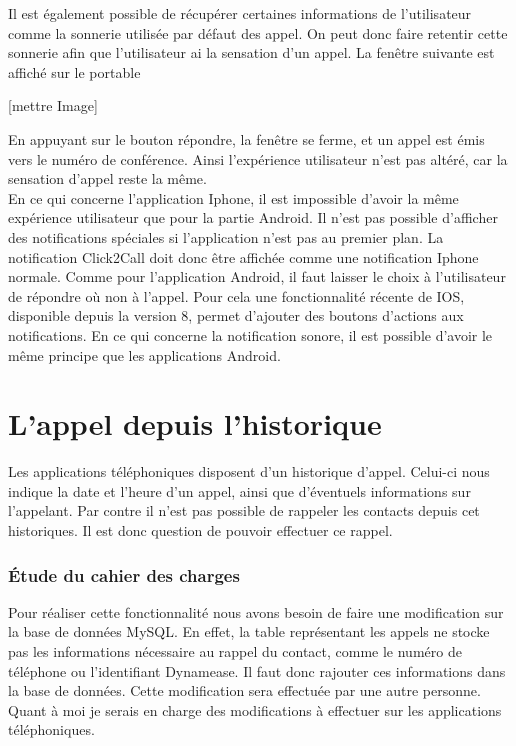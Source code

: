 Il est également possible de récupérer certaines informations de l'utilisateur comme la sonnerie utilisée par défaut des appel. On peut donc faire retentir cette sonnerie afin que l'utilisateur ai la sensation d'un appel. La fenêtre suivante est affiché sur le portable

[mettre Image]

En appuyant sur le bouton répondre, la fenêtre se ferme, et un appel est émis vers le numéro de conférence. Ainsi l'expérience utilisateur n'est pas altéré, car la sensation d'appel reste la même.\\

En ce qui concerne l'application Iphone, il est impossible d'avoir la même expérience utilisateur que pour la partie Android. Il n'est pas possible d'afficher des notifications spéciales si l'application n'est pas au premier plan. La notification Click2Call  doit donc être affichée comme une notification Iphone normale. Comme pour l'application Android, il faut laisser le choix à l'utilisateur de répondre où non à l'appel. Pour cela une fonctionnalité récente de IOS, disponible depuis la version 8, permet d'ajouter des boutons d'actions aux notifications. En ce qui concerne la notification sonore, il est possible d'avoir le même principe que les applications Android.


\section{L'appel depuis l'historique}

Les applications téléphoniques disposent d'un historique d'appel. Celui-ci nous indique la date et l'heure d'un appel, ainsi que d'éventuels informations sur l'appelant. Par contre il n'est pas possible de rappeler les contacts depuis cet historiques. Il est donc question de pouvoir effectuer ce rappel.

\subsubsection{Étude du cahier des charges}

Pour réaliser cette fonctionnalité nous avons besoin de faire une modification sur la base de données MySQL. En effet, la table représentant les appels ne stocke pas les informations nécessaire au rappel du contact, comme le numéro de téléphone ou l'identifiant Dynamease. Il faut donc rajouter ces informations dans la base de données. Cette modification sera effectuée par une autre personne. Quant à moi je serais en charge des modifications à effectuer sur les applications téléphoniques.


